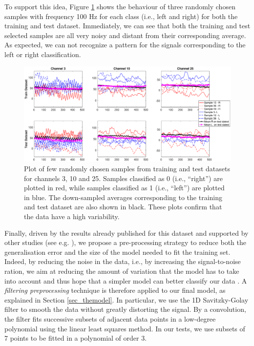 \documentclass{article}
\begin{document}
 To support this idea, Figure \ref{fig_fewsamples_vs_mean_downsampled}  shows the behaviour of three randomly chosen samples with frequency 100 Hz for each class (i.e., left and right) for both the training and test dataset. 
 Immediately, we can see that both the training and test selected samples are all very noisy and distant from their corresponding average.
 As expected, we can not recognize a pattern for the signals corresponding to the left or right classification. 
  \begin{figure}[h]
 \begin{center}
  \includegraphics[width=1\textwidth]{fig/fig5new_fewsamples_mean_downsampled} 
  \caption{Plot of few randomly chosen samples from training and test datasets for channels 3, 10 and 25.
  Samples classified as 0 (i.e., ``right'') are plotted in red, while   samples classified as 1 (i.e., ``left'') are plotted in blue.
  The down-sampled averages corresponding to the training and test dataset are also shown in black.
   These plots confirm that the data have a high variability. 
  \label{fig_fewsamples_vs_mean_downsampled}}
  \end{center}
  \end{figure}

Finally, driven by the results already published for this dataset \cite{bci_ii} and supported by other studies (see e.g. \cite{schirrmeister2017deep}), we propose a pre-processing strategy to reduce both the generalisation error and the size of the model needed to fit the training set.
Indeed, by reducing the noise in the data, i.e., by increasing the signal-to-noise ration, we aim at reducing the amount of variation that the model has to take into account and thus hope that a simpler model can better classify our data  \cite{goodfellow2016deep} . 
A \emph{filtering preprocessing} technique is therefore applied to our  final model, as explained in Section \ref{sec_themodel}.
In particular, we use the 1D Savitzky-Golay filter \cite{savgol} to smooth the data without greatly distorting the signal. 
By a convolution, the filter fits successive subsets of adjacent data points in a low-degree polynomial using the linear least squares method. 
In our tests, we use subsets of 7 points to be fitted in a polynomial of order 3. 
\end{document}
